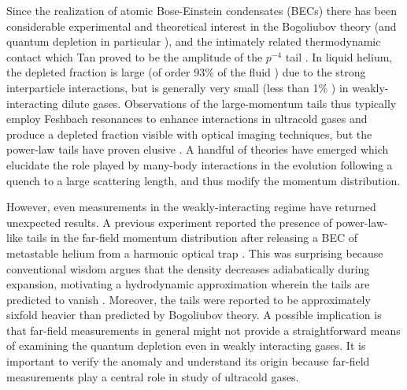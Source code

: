 	Since the realization of atomic Bose-Einstein condensates (BECs) there has been considerable experimental \cite{Stewart10,Wild12,Chang16,Makotyn14,Eigen18,Xu06,Vogels02,pieczarka20,Lopes17_depletion,Cayla20,Kuhnle11,Sagi12,Fletcher17,Lopes17_quasiparticle,Mukherjee19,Carcy19} and 
	theoretical \cite{Colussi20,Kira15_coherent,Decamp18,Smith14,Qu16,Braaten10,Braaten11,Rakhimov20,Braaten08,Zhang09,Combescot09,Werner12_boson,Werner12_fermion,Sinatra00,Deuar11} interest in the 
	Bogoliubov theory \cite{Vogels02,Steinhauer03,Lopes17_quasiparticle,Sinatra00,Deuar11} (and 
	quantum depletion in particular \cite{Lopes17_depletion,Chang16,Xu06,pieczarka20,Cayla20}), 
	and the intimately related thermodynamic 
	contact \cite{Stewart10,Tan08_momentum,Tan08_energetics,Tan08_virial, Braaten10,Braaten11,Colussi20,Makotyn14,Eigen18,Decamp18,Smith14,Chang16,Qu16,Wild12,Hoinka15,Rakhimov20,Braaten08,Smith14,Kuhnle11,Sagi12,Fletcher17,Mukherjee19,Carcy19,Zhang09,Combescot09,Werner12_boson,Werner12_fermion} which Tan proved to be the amplitude of the $p^{-4}$ tail \cite{Tan08_momentum}.
	In liquid helium, the depleted fraction is large (of order 93\% of the fluid \cite{Dmowski17,Glyde00,Moroni04}) due to the strong interparticle interactions, but is generally very small (less than 1\% \cite{Lopes17_depletion,Chang16}) in weakly-interacting dilute gases.
	Observations of the large-momentum tails thus typically employ Feshbach resonances to enhance interactions in ultracold gases and produce a depleted fraction visible with optical imaging techniques, but the power-law tails have proven elusive \cite{Makotyn14,Eigen18}. 
	A handful of theories have emerged \cite{Kira15_coherent,Colussi20,Smith14} which elucidate the role played by many-body interactions  in the evolution following a quench to a large scattering length, and thus modify the momentum distribution.

	However, even measurements in the weakly-interacting regime have returned unexpected results.
	A previous experiment reported the presence of power-law-like tails in the far-field momentum distribution after releasing a BEC of metastable helium from a harmonic optical trap \cite{Chang16}.
	This was surprising because conventional wisdom argues that the density decreases adiabatically during expansion, motivating a hydrodynamic approximation wherein the tails are predicted to vanish \cite{Qu16,Xu06}. 
	Moreover, the tails were reported to be approximately sixfold heavier than predicted by Bogoliubov theory.
	A possible implication is that far-field measurements in general might not provide a straightforward means of examining the quantum depletion even in weakly interacting gases.
	It is important to verify the anomaly and understand its origin because far-field measurements play a central role in study of ultracold gases.

